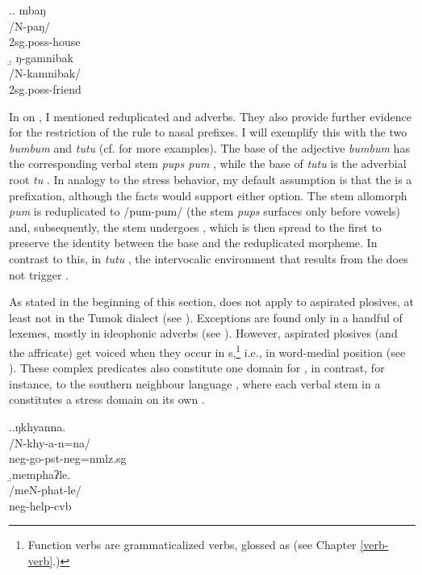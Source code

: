 \ex.\a. \glll mbaŋ\\
/N-paŋ/\\
{\sc 2sg.poss-}house\\
\b. \glll ŋ-gamnibak\\
/N-kamnibak/\\
{\sc 2sg.poss-}friend\\

		 		 
In  on , I mentioned reduplicated  and adverbs. They also provide further evidence for the restriction of the  rule to nasal prefixes. I will exemplify this with the two  \emph{bumbum}  and \emph{tutu}  (cf.  for more examples). The base of the adjective \emph{bumbum} has the corresponding verbal stem \emph{pups \ti pum} , while the base of \emph{tutu} is the adverbial root \emph{tu} . In analogy to the stress behavior, my default assumption is that the  is a prefixation, although the  facts would support either option. The stem allomorph \emph{pum} is reduplicated to /pum-pum/ (the stem \emph{pups} surfaces only before vowels) and, subsequently, the stem undergoes , which is then spread to the first  to preserve the identity between the base and the reduplicated morpheme. In contrast to this, in \emph{tutu} , the intervocalic environment that  results from the  does not trigger .  
 
As stated in the beginning of this section,  does not apply to aspirated plosives, at least not in the Tumok dialect (see \Next). Exceptions are found only in a handful of lexemes, mostly in ideophonic adverbs (see ). However, aspirated plosives (and the affricate) get voiced when they occur in s,\footnote{Function verbs are grammaticalized verbs, glossed as  (see Chapter \ref{verb-verb}.)} i.e., in word-medial position (see \NNext). These complex predicates also constitute one domain for , in contrast, for instance, to the southern neighbour language , where each verbal stem in a  constitutes a stress domain on its own \citep[57]{Bickeletal2007Free}. 

\ex.\a.\glll ŋkhyanna.\\
/N-khy-a-n=na/\\
{\sc neg-}go{\sc [3sg]-pst-neg=nmlz.sg}\\
\b.\glll memphaʔle.\\
/meN-phat-le/\\
{\sc neg-}help{\sc -cvb}\\


